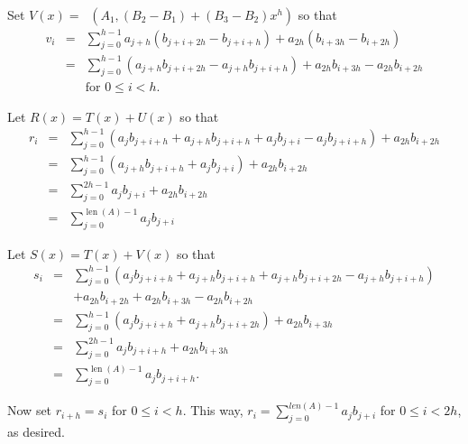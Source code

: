 \documentclass{article}
\DeclareMathOperator{\len}{len}
\DeclareMathOperator{\mult}{mul^{T}}
\begin{document}
Set $V(x) = \mult(A_1, (B_2 - B_1) + (B_3 - B_2) x^h)$ 
so that
\begin{eqnarray*}
v_i & = & \sum_{j=0}^{h-1} a_{j+h} (b_{j+i+2h} - b_{j+i+h}) + a_{2h}(b_{i+3h} - b_{i+2h})\\
    & = & \sum_{j=0}^{h-1} (a_{j+h} b_{j+i+2h} - a_{j+h} b_{j+i+h}) + a_{2h} b_{i+3h} - a_{2h} b_{i+2h}\\
& & \textrm{for } 0\leq i < h.
\end{eqnarray*}

Let $R(x) = T(x) + U(x)$ so that
\begin{eqnarray*}
r_i & = & \sum_{j=0}^{h-1} (a_j b_{j+i+h} + a_{j+h} b_{j+i+h} + a_j b_{j+i} - a_j b_{j+i+h}) + a_{2h} b_{i+2h} \\
    & = & \sum_{j=0}^{h-1} (a_{j+h} b_{j+i+h} + a_j b_{j+i}) + a_{2h} b_{i+2h} \\
    & = & \sum_{j=0}^{2h-1} a_j b_{j+i} + a_{2h} b_{i+2h} \\
    & = & \sum_{j=0}^{\len(A)-1} a_j b_{j+i}
\end{eqnarray*}

Let $S(x) = T(x) + V(x)$ so that
\begin{eqnarray*}
s_i & = & \sum_{j=0}^{h-1} (a_j b_{j+i+h} + a_{j+h} b_{j+i+h} + a_{j+h} b_{j+i+2h} - a_{j+h} b_{j+i+h}) \\
    &   &+ a_{2h} b_{i+2h} + a_{2h} b_{i+3h} - a_{2h} b_{i+2h}\\
    & = & \sum_{j=0}^{h-1} (a_j b_{j+i+h} + a_{j+h} b_{j+i+2h}) + a_{2h} b_{i+3h} \\
    & = & \sum_{j=0}^{2h-1} a_j b_{j+i+h} + a_{2h} b_{i+3h} \\
    & = & \sum_{j=0}^{\len(A)-1} a_j b_{j+i+h}.
\end{eqnarray*}

Now set $r_{i+h} = s_i$ for $0 \leq i < h$. This way, 
$r_i = \sum_{j=0}^{len(A)-1} a_j b_{j+i}$ for $0 \leq i < 2h$, as desired.
\end{document}

